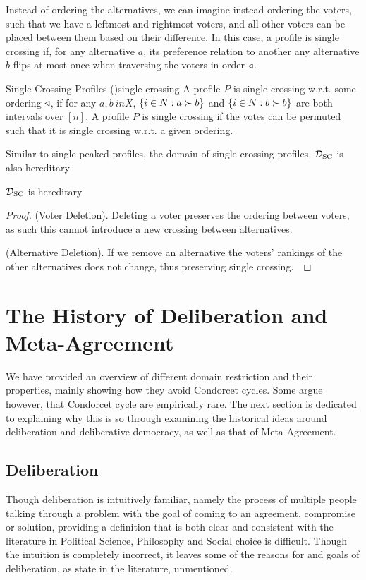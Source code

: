 Instead of ordering the alternatives, we can imagine instead ordering the voters, such that we have a leftmost and rightmost voters, and all other voters can be placed between them based on their difference. In this case, a profile is single crossing if, for any alternative $a$, its preference relation to another any alternative $b$ flips at most once when traversing the voters in order $\triangleleft$.

\begin{definition}{Single Crossing Profiles \textnormal{(\citet{elkindPreferenceRestrictionsComputational2022a})}}{single-crossing}
	A profile $P$ is single crossing w.r.t. some ordering $\triangleleft$, if for any $a,b \ in X$, $\{i \in N : a \succ b\}$ and $\{i \in N: b \succ b\}$ are both intervals over $[n]$. A profile $P$ is single crossing if the votes can be permuted such that it is single crossing w.r.t. a given ordering.
\end{definition}

Similar to single peaked profiles, the domain of single crossing profiles, $\mathcal{D}_{\text{SC}}$ is also hereditary

\begin{proposition}
	$\mathcal{D}_{\text{SC}}$ is hereditary
\end{proposition}

\begin{proof}
	(Voter Deletion). Deleting a voter preserves the ordering between voters, as such this cannot introduce a new crossing between alternatives.~\checkmark

	(Alternative Deletion). If we remove an alternative the voters' rankings of the other alternatives does not change, thus preserving single crossing.~\checkmark
\end{proof}

\section{The History of Deliberation and Meta-Agreement}

We have provided an overview of different domain restriction and their properties, mainly showing how they avoid Condorcet cycles. Some argue however, that Condorcet cycle are empirically rare. The next section is dedicated to explaining why this is so through examining the historical ideas around deliberation and deliberative democracy, as well as that of Meta-Agreement.

\subsection{Deliberation}
Though deliberation is intuitively familiar, namely the process of multiple people talking through a problem with the goal of coming to an agreement, compromise or solution, providing a definition that is both clear and consistent with the literature in Political Science, Philosophy and Social choice is difficult. Though the intuition is completely incorrect, it leaves some of the reasons for and goals of deliberation, as state in the literature, unmentioned.


